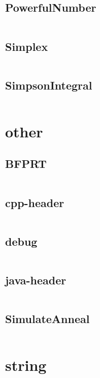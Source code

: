 \documentclass[a4]{article}
\begin{document}
\subsection{PowerfulNumber}
\inputminted[mathescape,linenos,numbersep=5pt,frame=lines,framesep=2mm]{cpp}{src/math/PowerfulNumber.cpp}
\subsection{Simplex}
\inputminted[mathescape,linenos,numbersep=5pt,frame=lines,framesep=2mm]{cpp}{src/math/Simplex.cpp}
\subsection{SimpsonIntegral}
\inputminted[mathescape,linenos,numbersep=5pt,frame=lines,framesep=2mm]{cpp}{src/math/SimpsonIntegral.cpp}
\section{other}
\subsection{BFPRT}
\inputminted[mathescape,linenos,numbersep=5pt,frame=lines,framesep=2mm]{cpp}{src/other/BFPRT.cpp}
\subsection{cpp-header}
\inputminted[mathescape,linenos,numbersep=5pt,frame=lines,framesep=2mm]{cpp}{src/other/cpp-header.cpp}
\subsection{debug}
\inputminted[mathescape,linenos,numbersep=5pt,frame=lines,framesep=2mm]{h}{src/other/debug.h}
\subsection{java-header}
\inputminted[mathescape,linenos,numbersep=5pt,frame=lines,framesep=2mm]{java}{src/other/java-header.java}
\subsection{SimulateAnneal}
\inputminted[mathescape,linenos,numbersep=5pt,frame=lines,framesep=2mm]{cpp}{src/other/SimulateAnneal.cpp}
\section{string}
\end{document}
